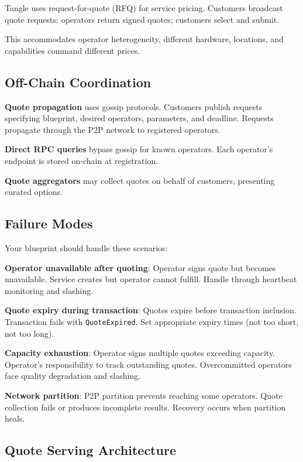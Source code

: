 \documentclass[11pt,a4paper]{article}
\begin{document}
Tangle uses request-for-quote (RFQ) for service pricing. Customers broadcast quote requests; operators return signed quotes; customers select and submit.

This accommodates operator heterogeneity, different hardware, locations, and capabilities command different prices.

\subsection{Off-Chain Coordination}

\textbf{Quote propagation} uses gossip protocols. Customers publish requests specifying blueprint, desired operators, parameters, and deadline. Requests propagate through the P2P network to registered operators.

\textbf{Direct RPC queries} bypass gossip for known operators. Each operator's endpoint is stored on-chain at registration.

\textbf{Quote aggregators} may collect quotes on behalf of customers, presenting curated options.

\subsection{Failure Modes}

Your blueprint should handle these scenarios:

\textbf{Operator unavailable after quoting}: Operator signs quote but becomes unavailable. Service creates but operator cannot fulfill. Handle through heartbeat monitoring and slashing.

\textbf{Quote expiry during transaction}: Quotes expire before transaction inclusion. Transaction fails with \texttt{QuoteExpired}. Set appropriate expiry times (not too short, not too long).

\textbf{Capacity exhaustion}: Operator signs multiple quotes exceeding capacity. Operator's responsibility to track outstanding quotes. Overcommitted operators face quality degradation and slashing.

\textbf{Network partition}: P2P partition prevents reaching some operators. Quote collection fails or produces incomplete results. Recovery occurs when partition heals.

\subsection{Quote Serving Architecture}
\end{document}
